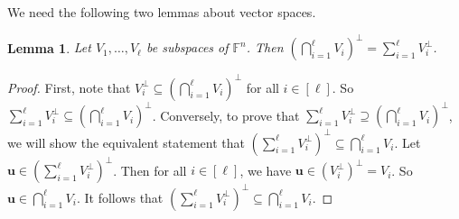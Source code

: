 \documentclass[11pt]{article}
\theoremstyle{plain}
\newtheorem{lemma}[thm]{Lemma}
\theoremstyle{definition}
\theoremstyle{remark}
\newcommand{\F}{\mathbb{F}}
\newcommand{\bv}{\bm{v}}
\newcommand{\bu}{\bm{u}}
\begin{document}
We need the following two lemmas about vector spaces.
\begin{lemma}\label{lm:dualspace}
Let $V_1,\ldots,V_\ell$ be subspaces of $\F^n$. Then $\left(\bigcap_{i=1}^{\ell}V_i\right)^{\perp}=\sum_{i=1}^{\ell} V_i^{\perp}$.
\end{lemma}
\begin{proof} 
First, note that $V_i^\perp \subseteq \left(\bigcap_{i=1}^{\ell}V_i\right)^{\perp}$ for all $i\in [\ell]$. So $\sum_{i=1}^{\ell} V_i^{\perp}\subseteq \left(\bigcap_{i=1}^{\ell}V_i\right)^{\perp}$.
Conversely, to prove that $\sum_{i=1}^{\ell} V_i^{\perp}\supseteq \left(\bigcap_{i=1}^{\ell}V_i\right)^{\perp}$, we will show the equivalent statement that
$\left(\sum_{i=1}^{\ell} V_i^{\perp}\right)^{\perp}\subseteq \bigcap_{i=1}^{\ell}V_i$. Let $\bu\in \left(\sum_{i=1}^{\ell} V_i^{\perp}\right)^{\perp}$. Then for all $i\in [\ell]$, we have $\bu\in (V_i^\perp)^\perp=V_i$. So $\bu\in \bigcap_{i=1}^{\ell}V_i$. It follows that $\left(\sum_{i=1}^{\ell} V_i^{\perp}\right)^{\perp}\subseteq \bigcap_{i=1}^{\ell}V_i$.

\end{proof}
\end{document}
